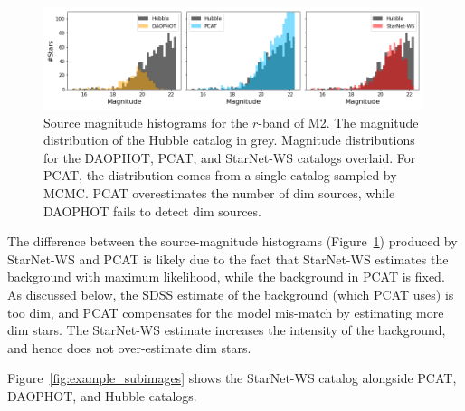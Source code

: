 \begin{figure}[tb]
    \centering
    \includegraphics[width=0.99\textwidth]{figures/m2_results/luminosity_fun.png}
    \caption{Source magnitude histograms for the $r$-band of M2. 
    The magnitude distribution of the Hubble catalog in grey. 
    Magnitude distributions for the DAOPHOT, PCAT, and StarNet-WS catalogs overlaid.
    For PCAT, the distribution comes from a single catalog sampled by MCMC. 
    PCAT overestimates the number of dim sources, 
    while DAOPHOT fails to detect dim sources. }
    \label{fig:luminosity_fun_m2}
\end{figure}

The difference between the source-magnitude histograms  (Figure~\ref{fig:luminosity_fun_m2}) produced by StarNet-WS and PCAT
is likely due to the fact that StarNet-WS estimates the background with maximum likelihood, while the background in PCAT is fixed.
As discussed below, the SDSS estimate of the background (which PCAT uses) is too dim, and PCAT compensates for the model mis-match by estimating more dim stars. 
The StarNet-WS estimate increases the intensity of the background, and hence does not over-estimate dim stars. 

Figure~\ref{fig:example_subimages} shows the StarNet-WS catalog alongside PCAT, DAOPHOT, and Hubble catalogs. 

